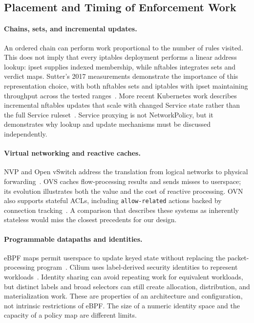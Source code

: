 \documentclass[letterpaper,twocolumn,10pt]{article}
\begin{document}
\subsection{Placement and Timing of Enforcement Work}
\paragraph{Chains, sets, and incremental updates.}
An ordered chain can perform work proportional to the number of rules
visited. This does not imply that every iptables deployment performs a
linear address lookup: ipset supplies indexed membership, while nftables
integrates sets and verdict maps. Sutter's 2017 measurements demonstrate
the importance of this representation choice, with both nftables sets and
iptables with ipset maintaining throughput across the tested
ranges~\cite{sutter2017nftables}. More recent Kubernetes work describes
incremental nftables updates that scale with changed Service state rather
than the full Service ruleset~\cite{winship2025nftables}. Service proxying
is not NetworkPolicy, but it demonstrates why lookup and update mechanisms
must be discussed independently.

\paragraph{Virtual networking and reactive caches.}
NVP and Open vSwitch address the translation from logical networks to
physical forwarding~\cite{koponen2014nvp,pfaff2015ovs}. OVS caches
flow-processing results and sends misses to userspace; its evolution
illustrates both the value and the cost of reactive processing. OVN also
supports stateful ACLs, including \texttt{allow-related} actions backed by
connection tracking~\cite{ovnacl}. A comparison that describes these
systems as inherently stateless would miss the closest precedents for
our design.

\paragraph{Programmable datapaths and identities.}
eBPF maps permit userspace to update keyed state without replacing the
packet-processing program~\cite{linuxbpfmaps}. Cilium uses label-derived
security identities to represent workloads~\cite{ciliumidentities}.
Identity sharing can avoid repeating work for equivalent workloads, but
distinct labels and broad selectors can still create allocation,
distribution, and materialization work. These are properties of an
architecture and configuration, not intrinsic restrictions of eBPF. The
size of a numeric identity space and the capacity of a policy map are
different limits.
\end{document}
